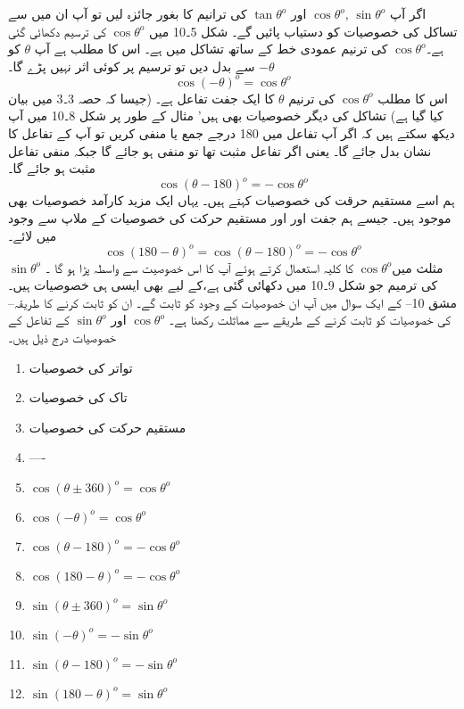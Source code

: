 اگر آپ \( \cos \theta^o, \,\sin \theta^o \) اور  \(\tan \theta^o\) کی ترانیم کا بغور جائزہ لیں تو آپ ان میں سے تساکل کی خصوصیات کو دستیاب پائیں گے۔ شکل 5۔10 میں \(\cos \theta^o\) کی ترسیم دکھائی گئی ہے۔\(\cos \theta^o\)  کی ترنیم عمودی خط کے ساتھ تشاکل میں ہے۔ اس کا مطلب ہے آپ \(\theta\) کو \(-\theta\) سے بدل دیں تو  ترسیم پر کوئی اثر نہیں پڑے گا۔
\[ \cos (-\theta)^o = \cos \theta^o \]
اس کا مطلب \(\cos \theta^o\) کی ترنیم \(\theta\)
 کا ایک جفت تفاعل ہے۔ (جیسا کہ حصہ 3۔3 میں بیان کیا گیا ہے) 
تشاکل کی دیگر خصوصیات بھی ہیں' مثال کے طور پر شکل 8۔10 میں آپ دیکھ سکتے ہیں کہ اگر آپ تفاعل میں 180 درجے جمع یا منفی کریں تو آپ کے تفاعل کا نشان بدل جائے گا۔ یعنی اگر تفاعل مثبت تھا تو منفی ہو جائے گا جبکہ منفی تفاعل مثبت ہو جائے گا۔
\[\cos (\theta -180)^o =-\cos \theta^o\]
 ہم اسے مستقیم حرقت کی خصوصیات کہتے ہیں۔ 
یہاں ایک مزید کارآمد خصوصیات بھی موجود ہیں۔ جیسے ہم جفت اور اور مستقیم حرکت کی خصوصیات کے ملاپ سے وجود میں لائے۔
\[\cos (180 - \theta)^o =\cos (\theta -180)^o=-\cos \theta^o\]
مثلث میں\(\cos \theta^o\) کا کلیہ استعمال کرتے ہوئے آپ کا اس خصوصیت سے واسطہ پڑا ہو گا ۔   \(\sin \theta^o\) کی ترمیم جو شکل 9۔10 میں دکھائی گئی ہے،کے لیے بھی ایسی ہی خصوصیات ہیں۔ مشق 10-- کے ایک سوال میں آپ ان خصوصیات کے وجود کو ثابت گے۔ ان کو ثابت کرنے کا طریقہ-- کی خصوصیات کو ثابت کرنے کے طریقے سے مماثلت رکھنا ہے۔  \(\cos \theta^o\)   اور  \(\sin \theta^o\)
 کے تفاعل کے خصوصیات درج ذیل ہیں۔
\begin{multicols}{3}
\begin{enumerate}[]
\item تواتر کی خصوصیات
\item تاک کی خصوصیات 
\item مستقیم حرکت کی خصوصیات
\item ----
\item \(\cos ( \theta \pm 360)^o=\cos \theta^o\)
\item \(\cos (-\theta)^o= \cos \theta^o\)
\item \(\cos (\theta -180)^o=-\cos \theta^o\)
\item \( \cos (180- \theta)^o=-\cos \theta^o\)
\item  \(\sin (\theta \pm 360)^o=\sin \theta^o \)
\item \( \sin (-\theta)^o= -\sin \theta^o \)
\item \(\sin (\theta - 180)^o=-\sin \theta^o\)
\item \( \sin (180-\theta )^o=\sin \theta^o\)
\end{enumerate}
\end{multicols}



